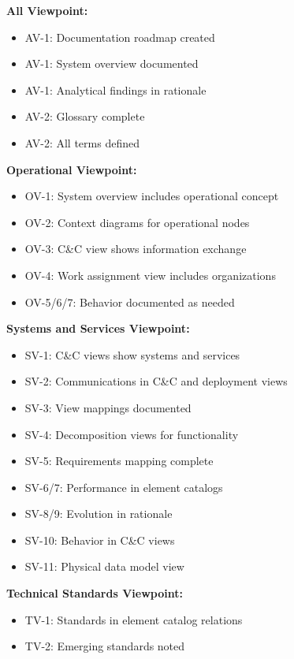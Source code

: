 \documentclass[11pt]{article}
\begin{document}
\begin{checklistbox}

\textbf{All Viewpoint:}
\begin{itemize}[leftmargin=1.5cm]
    \item[$\square$] AV-1: Documentation roadmap created
    \item[$\square$] AV-1: System overview documented
    \item[$\square$] AV-1: Analytical findings in rationale
    \item[$\square$] AV-2: Glossary complete
    \item[$\square$] AV-2: All terms defined
\end{itemize}

\textbf{Operational Viewpoint:}
\begin{itemize}[leftmargin=1.5cm]
    \item[$\square$] OV-1: System overview includes operational concept
    \item[$\square$] OV-2: Context diagrams for operational nodes
    \item[$\square$] OV-3: C\&C view shows information exchange
    \item[$\square$] OV-4: Work assignment view includes organizations
    \item[$\square$] OV-5/6/7: Behavior documented as needed
\end{itemize}

\textbf{Systems and Services Viewpoint:}
\begin{itemize}[leftmargin=1.5cm]
    \item[$\square$] SV-1: C\&C views show systems and services
    \item[$\square$] SV-2: Communications in C\&C and deployment views
    \item[$\square$] SV-3: View mappings documented
    \item[$\square$] SV-4: Decomposition views for functionality
    \item[$\square$] SV-5: Requirements mapping complete
    \item[$\square$] SV-6/7: Performance in element catalogs
    \item[$\square$] SV-8/9: Evolution in rationale
    \item[$\square$] SV-10: Behavior in C\&C views
    \item[$\square$] SV-11: Physical data model view
\end{itemize}

\textbf{Technical Standards Viewpoint:}
\begin{itemize}[leftmargin=1.5cm]
    \item[$\square$] TV-1: Standards in element catalog relations
    \item[$\square$] TV-2: Emerging standards noted
\end{itemize}
\end{checklistbox}
\end{document}
